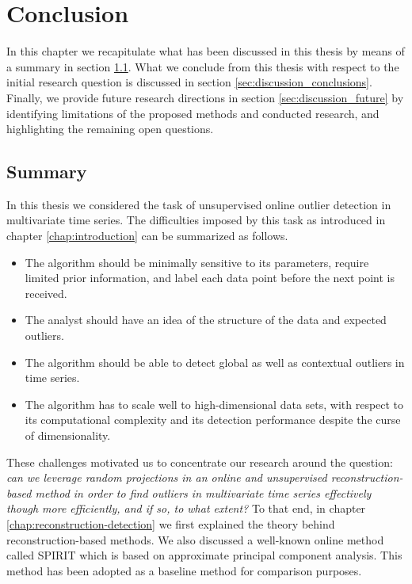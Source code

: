 \chapter{Conclusion}
\label{chap:discussion}

In this chapter we recapitulate what has been discussed in this thesis by means of a summary in section \ref{sec:discussion_summary}. What we conclude from this thesis with respect to the initial research question is discussed in section \ref{sec:discussion_conclusions}. Finally, we provide future research directions in section \ref{sec:discussion_future} by identifying limitations of the proposed methods and conducted research, and highlighting the remaining open questions.

\section{Summary}
\label{sec:discussion_summary}

In this thesis we considered the task of unsupervised online outlier detection in multivariate time series. The difficulties imposed by this task as introduced in chapter \ref{chap:introduction} can be summarized as follows.

\begin{itemize}
	\itemsep-0.2em
	\item The algorithm should be minimally sensitive to its parameters, require limited prior information, and label each data point before the next point is received.	
	\item The analyst should have an idea of the structure of the data and expected outliers.
	\item The algorithm should be able to detect global as well as contextual outliers in time series.
	\item The algorithm has to scale well to high-dimensional data sets, with respect to its computational complexity and its detection performance despite the curse of dimensionality.
\end{itemize} 

These challenges motivated us to concentrate our research around the question: \textit{can we leverage random projections in an online and unsupervised reconstruction-based method in order to find outliers in multivariate time series effectively though more efficiently, and if so, to what extent?} To that end, in chapter \ref{chap:reconstruction-detection} we first explained the theory behind reconstruction-based methods. We also discussed a well-known online method called SPIRIT which is based on approximate principal component analysis. This method has been adopted as a baseline method for comparison purposes. 


